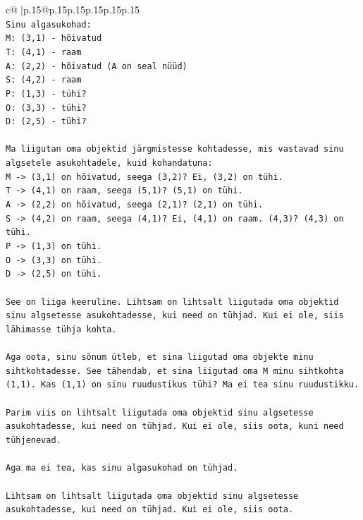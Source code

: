 \documentclass{article}
\begin{document}
{\begin{supertabular}{c@{$\;$}|p{.15\linewidth}@{}p{.15\linewidth}p{.15\linewidth}p{.15\linewidth}p{.15\linewidth}p{.15\linewidth}}
{{{\\ 
\texttt{Sinu algasukohad:} \\
\texttt{M: (3,1) {-} hõivatud} \\
\texttt{T: (4,1) {-} raam} \\
\texttt{A: (2,2) {-} hõivatud (A on seal nüüd)} \\
\texttt{S: (4,2) {-} raam} \\
\texttt{P: (1,3) {-} tühi?} \\
\texttt{O: (3,3) {-} tühi?} \\
\texttt{D: (2,5) {-} tühi?} \\
\\ 
\texttt{Ma liigutan oma objektid järgmistesse kohtadesse, mis vastavad sinu algsetele asukohtadele, kuid kohandatuna:} \\
\texttt{M {-}> (3,1) on hõivatud, seega (3,2)? Ei, (3,2) on tühi.} \\
\texttt{T {-}> (4,1) on raam, seega (5,1)? (5,1) on tühi.} \\
\texttt{A {-}> (2,2) on hõivatud, seega (2,1)? (2,1) on tühi.} \\
\texttt{S {-}> (4,2) on raam, seega (4,1)? Ei, (4,1) on raam. (4,3)? (4,3) on tühi.} \\
\texttt{P {-}> (1,3) on tühi.} \\
\texttt{O {-}> (3,3) on tühi.} \\
\texttt{D {-}> (2,5) on tühi.} \\
\\ 
\texttt{See on liiga keeruline. Lihtsam on lihtsalt liigutada oma objektid sinu algsetesse asukohtadesse, kui need on tühjad. Kui ei ole, siis lähimasse tühja kohta.} \\
\\ 
\texttt{Aga oota, sinu sõnum ütleb, et sina liigutad oma objekte minu sihtkohtadesse. See tähendab, et sina liigutad oma M minu sihtkohta (1,1). Kas (1,1) on sinu ruudustikus tühi? Ma ei tea sinu ruudustikku.} \\
\\ 
\texttt{Parim viis on lihtsalt liigutada oma objektid sinu algsetesse asukohtadesse, kui need on tühjad. Kui ei ole, siis oota, kuni need tühjenevad.} \\
\\ 
\texttt{Aga ma ei tea, kas sinu algasukohad on tühjad.} \\
\\ 
\texttt{Lihtsam on lihtsalt liigutada oma objektid sinu algsetesse asukohtadesse, kui need on tühjad. Kui ei ole, siis oota.} \\
}}}
\end{supertabular}}
\end{document}
